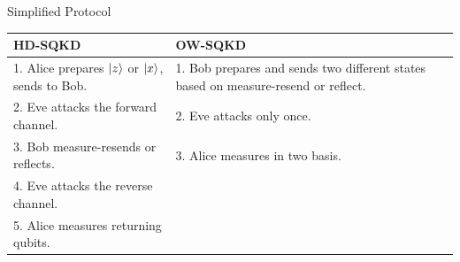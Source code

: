 \documentclass[final]{beamer}
\newlength{\onecolwid}
\newlength{\twocolwid}
\begin{document}
\begin{frame}[t]
\begin{columns}[t]
\begin{column}{\twocolwid}

\begin{columns}[t,totalwidth=\twocolwid] %

\begin{column}{\onecolwid} %


\begin{block}{Simplified Protocol}



      \begin{tabular}{|p{14cm}|p{14cm}|}
      	\hline 
      	\textbf{HD-SQKD} & \textbf{OW-SQKD}\\
      	\hline \hline
      	1. Alice prepares $\ket{z}$ or $\ket{x}$, sends to Bob.  & 1. Bob prepares and sends two different states based on measure-resend or reflect.\\ \hline
      	2. Eve attacks the forward channel.  & 2. Eve attacks only once. \\ \hline
      	3. Bob measure-resends or reflects. & 3. Alice measures in two basis. \\ \hline
      	4. Eve attacks the reverse channel. & \\ \cline{1-1}
		5. Alice measures returning qubits. & \\
      	\hline
      \end{tabular}



\end{block}


\end{column}
\end{columns}
\end{column}
\end{columns}
\end{frame}
\end{document}
